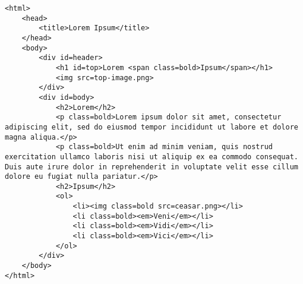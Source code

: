 \documentclass[10pt]{article}
\theoremstyle{definition}
\begin{document}
\newpage
\begin{lstlisting}
<html>
    <head>
        <title>Lorem Ipsum</title>
    </head>
    <body>
        <div id=header>
            <h1 id=top>Lorem <span class=bold>Ipsum</span></h1>
            <img src=top-image.png>
        </div>
        <div id=body>
            <h2>Lorem</h2>
            <p class=bold>Lorem ipsum dolor sit amet, consectetur adipiscing elit, sed do eiusmod tempor incididunt ut labore et dolore magna aliqua.</p>
            <p class=bold>Ut enim ad minim veniam, quis nostrud exercitation ullamco laboris nisi ut aliquip ex ea commodo consequat. Duis aute irure dolor in reprehenderit in voluptate velit esse cillum dolore eu fugiat nulla pariatur.</p>
            <h2>Ipsum</h2>
            <ol>
                <li><img class=bold src=ceasar.png></li>
                <li class=bold><em>Veni</em></li>
                <li class=bold><em>Vidi</em></li>
                <li class=bold><em>Vici</em></li>
            </ol>
        </div>
    </body>
</html>
\end{lstlisting}
\end{document}
